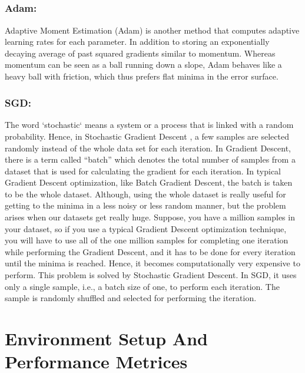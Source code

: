 \documentclass{report}
\begin{document}
\paragraph{}

\subsection{Adam: }
Adaptive Moment Estimation (Adam) \cite{Adam} is another method that computes adaptive learning rates for each parameter. In addition to storing an exponentially decaying average of past squared gradients similar to momentum. Whereas momentum can be seen as a ball running down a slope, Adam behaves like a heavy ball with friction, which thus prefers flat minima in the error surface.
\paragraph{}

\subsection{SGD: }
The word ‘stochastic‘ means a system or a process that is linked with a random probability. Hence, in Stochastic Gradient Descent \cite{SGD}, a few samples are selected randomly instead of the whole data set for each iteration. In Gradient Descent, there is a term called “batch” which denotes the total number of samples from a dataset that is used for calculating the gradient for each iteration. In typical Gradient Descent optimization, like Batch Gradient Descent, the batch is taken to be the whole dataset. Although, using the whole dataset is really useful for getting to the minima in a less noisy or less random manner, but the problem arises when our datasets get really huge.
Suppose, you have a million samples in your dataset, so if you use a typical Gradient Descent optimization technique, you will have to use all of the one million samples for completing one iteration while performing the Gradient Descent, and it has to be done for every iteration until the minima is reached. Hence, it becomes computationally very expensive to perform.
This problem is solved by Stochastic Gradient Descent. In SGD, it uses only a single sample, i.e., a batch size of one, to perform each iteration. The sample is randomly shuffled and selected for performing the iteration.

\chapter{Environment Setup And Performance Metrices}
\end{document}
